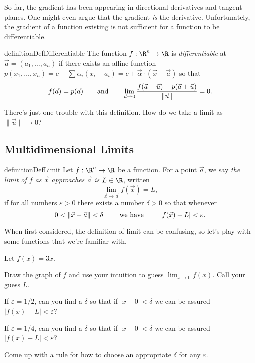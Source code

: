 	So far, the gradient has been appearing in directional derivatives and tangent planes.
	One might even argue that the gradient \emph{is} the derivative.  Unfortunately, the gradient
	of a function existing is not sufficient for a function to be differentiable.

\begin{restatable*}[Differentiable]{definition}{DefDifferentiable}
	The function $f:\R^n\to \R$ is 
	\emph{differentiable}
	at $\vec a=(a_1,\ldots,a_n)$ if there exists
	an affine function $p(x_1,\ldots, x_n)
	= c+\sum \alpha_i (x_i-a_i) = c+\vec \alpha \cdot(\vec x-\vec a)$ so that
	\[
		f(\vec a)=p(\vec a)\qquad\text{and}\qquad\lim_{\vec u\to0} \frac{f(\vec a + \vec u)-p(\vec a + \vec u)}{\lVert\vec u\rVert} = 0.
	\]
\end{restatable*}

	There's just one trouble with this definition.  How do we take a limit as $\|\vec u\|\to 0$?


\subsection*{Multidimensional Limits}

\begin{restatable*}[Limit]{definition}{DefLimit}
	Let $f:\R^n\to \R$ be a function.  For a point $\vec a$,
	we say \emph{the limit of $f$ as $\vec x$ approaches
	$\vec a$ is $L\in\R$}, written
	\[
		\lim_{\vec x\to \vec a}f(\vec x)=L,
	\]
	if for all numbers $\varepsilon>0$ there exists a number
	$\delta >0$ so that whenever
	\[
		0<\lVert\vec x-\vec a\rVert<\delta\qquad\text{ we have }\qquad\lvert f(\vec x)-L\rvert<\varepsilon.
	\]
\end{restatable*}

	When first considered, the definition of limit can be confusing, so let's play with some functions
	that we're familiar with.

\begin{question}
	Let $f(x) = 3x$.
	\begin{parts}
		\item  Draw the graph of $f$ and use your intuition to guess $\lim_{x\to 0} f(x)$.  Call your
			guess $L$.
		\item If $\varepsilon = 1/2$, can you find a $\delta$ so that if $|x-0|<\delta$ we can be assured
			$|f(x)-L|<\varepsilon$?
		\item If $\varepsilon = 1/4$, can you find a $\delta$ so that if $|x-0|<\delta$ we can be assured
			$|f(x)-L|<\varepsilon$?
		\item Come up with a rule for how to choose an appropriate $\delta$ for any $\varepsilon$.
	\end{parts}
\end{question}

